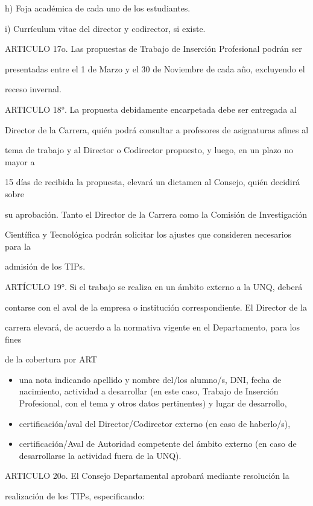 \documentclass[a4paper,12pt]{article}
\begin{document}
h) Foja académica de cada uno de los estudiantes.

i) Currículum vitae del director y codirector, si existe.

ARTICULO 17o. Las propuestas de Trabajo de Inserción Profesional podrán ser

presentadas entre el 1 de Marzo y el 30 de Noviembre de cada año, excluyendo el

receso invernal.

ARTICULO 18°. La propuesta debidamente encarpetada debe ser entregada al

Director de la Carrera, quién podrá consultar a profesores de asignaturas afines al

tema de trabajo y al Director o Codirector propuesto, y luego, en un plazo no mayor a

15 días de recibida la propuesta, elevará un dictamen al Consejo, quién decidirá sobre

su aprobación. Tanto el Director de la Carrera como la Comisión de Investigación

Científica y Tecnológica podrán solicitar los ajustes que consideren necesarios para la

admisión de los TIPs. 

ARTÍCULO 19°. Si el trabajo se realiza en un ámbito externo a la UNQ, deberá

contarse con el aval de la empresa o institución correspondiente. El Director de la

carrera elevará, de acuerdo a la normativa vigente en el Departamento, para los fines

de la cobertura por ART

\begin{itemize}
 \item una nota indicando apellido y nombre del/los alumno/s, DNI, fecha
 de nacimiento, actividad a desarrollar (en este caso, Trabajo de
 Inserción Profesional, con el tema y otros datos pertinentes) y lugar
 de desarrollo,
 \item certificación/aval del Director/Codirector externo (en caso de
 haberlo/s),
 \item certificación/Aval de Autoridad competente del ámbito externo (en
 caso de desarrollarse la actividad fuera de la UNQ).
\end{itemize}


ARTICULO 20o. El Consejo Departamental aprobará mediante resolución la

realización de los TIPs, especificando:
\end{document}
